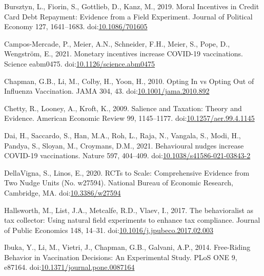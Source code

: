 \documentclass[
  11pt,
  a4paper,
]{article}
\newlength{\cslhangindent}
\newlength{\cslentryspacingunit} %
\newenvironment{CSLReferences}[2] %
 {%
  \setlength{\parindent}{0pt}
  \ifodd #1
  \let\oldpar\par
  \def\par{\hangindent=\cslhangindent\oldpar}
  \fi
  \setlength{\parskip}{#2\cslentryspacingunit}
 }%
 {}
\begin{document}
\begin{CSLReferences}{1}{0}
\leavevmode{}%
Bursztyn, L., Fiorin, S., Gottlieb, D., Kanz, M., 2019. Moral {Incentives} in {Credit Card Debt Repayment}: {Evidence} from a {Field Experiment}. Journal of Political Economy 127, 1641--1683. doi:\href{https://doi.org/10.1086/701605}{10.1086/701605}

\leavevmode{}%
Campos-Mercade, P., Meier, A.N., Schneider, F.H., Meier, S., Pope, D., Wengström, E., 2021. Monetary incentives increase {COVID-19} vaccinations. Science eabm0475. doi:\href{https://doi.org/10.1126/science.abm0475}{10.1126/science.abm0475}

\leavevmode{}%
Chapman, G.B., Li, M., Colby, H., Yoon, H., 2010. Opting {In} vs {Opting Out} of {Influenza Vaccination}. JAMA 304, 43. doi:\href{https://doi.org/10.1001/jama.2010.892}{10.1001/jama.2010.892}

\leavevmode{}%
Chetty, R., Looney, A., Kroft, K., 2009. Salience and {Taxation}: {Theory} and {Evidence}. American Economic Review 99, 1145--1177. doi:\href{https://doi.org/10.1257/aer.99.4.1145}{10.1257/aer.99.4.1145}

\leavevmode{}%
Dai, H., Saccardo, S., Han, M.A., Roh, L., Raja, N., Vangala, S., Modi, H., Pandya, S., Sloyan, M., Croymans, D.M., 2021. Behavioural nudges increase {COVID-19} vaccinations. Nature 597, 404--409. doi:\href{https://doi.org/10.1038/s41586-021-03843-2}{10.1038/s41586-021-03843-2}

\leavevmode{}%
DellaVigna, S., Linos, E., 2020. {RCTs} to {Scale}: {Comprehensive Evidence} from {Two Nudge Units} (No. w27594). {National Bureau of Economic Research}, {Cambridge, MA}. doi:\href{https://doi.org/10.3386/w27594}{10.3386/w27594}

\leavevmode{}%
Hallsworth, M., List, J.A., Metcalfe, R.D., Vlaev, I., 2017. The behavioralist as tax collector: {Using} natural field experiments to enhance tax compliance. Journal of Public Economics 148, 14--31. doi:\href{https://doi.org/10.1016/j.jpubeco.2017.02.003}{10.1016/j.jpubeco.2017.02.003}

\leavevmode{}%
Ibuka, Y., Li, M., Vietri, J., Chapman, G.B., Galvani, A.P., 2014. Free-{Riding Behavior} in {Vaccination Decisions}: {An Experimental Study}. PLoS ONE 9, e87164. doi:\href{https://doi.org/10.1371/journal.pone.0087164}{10.1371/journal.pone.0087164}


\end{CSLReferences}
\end{document}
